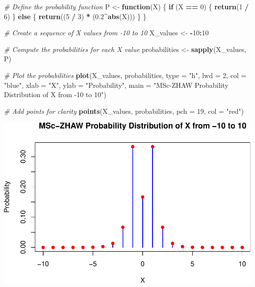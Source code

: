 \documentclass[
]{book}
\newenvironment{Shaded}{\begin{snugshade}}{\end{snugshade}}
\newcommand{\AttributeTok}[1]{\textcolor[rgb]{0.13,0.29,0.53}{#1}}
\newcommand{\CommentTok}[1]{\textcolor[rgb]{0.56,0.35,0.01}{\textit{#1}}}
\newcommand{\ControlFlowTok}[1]{\textcolor[rgb]{0.13,0.29,0.53}{\textbf{#1}}}
\newcommand{\DecValTok}[1]{\textcolor[rgb]{0.00,0.00,0.81}{#1}}
\newcommand{\FloatTok}[1]{\textcolor[rgb]{0.00,0.00,0.81}{#1}}
\newcommand{\FunctionTok}[1]{\textcolor[rgb]{0.13,0.29,0.53}{\textbf{#1}}}
\newcommand{\NormalTok}[1]{#1}
\newcommand{\OtherTok}[1]{\textcolor[rgb]{0.56,0.35,0.01}{#1}}
\newcommand{\SpecialCharTok}[1]{\textcolor[rgb]{0.81,0.36,0.00}{\textbf{#1}}}
\newcommand{\StringTok}[1]{\textcolor[rgb]{0.31,0.60,0.02}{#1}}
\newcommand{\pandocbounded}[1]{#1}
\begin{document}
\begin{Shaded}
\begin{Highlighting}[]
\CommentTok{\# Define the probability function}
\NormalTok{P }\OtherTok{\textless{}{-}} \ControlFlowTok{function}\NormalTok{(X) \{}
  \ControlFlowTok{if}\NormalTok{ (X }\SpecialCharTok{==} \DecValTok{0}\NormalTok{) \{}
    \FunctionTok{return}\NormalTok{(}\DecValTok{1} \SpecialCharTok{/} \DecValTok{6}\NormalTok{)}
\NormalTok{  \} }\ControlFlowTok{else}\NormalTok{ \{}
    \FunctionTok{return}\NormalTok{((}\DecValTok{5} \SpecialCharTok{/} \DecValTok{3}\NormalTok{) }\SpecialCharTok{*}\NormalTok{ (}\FloatTok{0.2}\SpecialCharTok{\^{}}\FunctionTok{abs}\NormalTok{(X)))}
\NormalTok{  \}}
\NormalTok{\}}

\CommentTok{\# Create a sequence of X values from {-}10 to 10}
\NormalTok{X\_values }\OtherTok{\textless{}{-}} \SpecialCharTok{{-}}\DecValTok{10}\SpecialCharTok{:}\DecValTok{10}

\CommentTok{\# Compute the probabilities for each X value}
\NormalTok{probabilities }\OtherTok{\textless{}{-}} \FunctionTok{sapply}\NormalTok{(X\_values, P)}

\CommentTok{\# Plot the probabilities}
\FunctionTok{plot}\NormalTok{(X\_values, probabilities, }\AttributeTok{type =} \StringTok{"h"}\NormalTok{, }\AttributeTok{lwd =} \DecValTok{2}\NormalTok{, }\AttributeTok{col =} \StringTok{"blue"}\NormalTok{,}
     \AttributeTok{xlab =} \StringTok{"X"}\NormalTok{, }\AttributeTok{ylab =} \StringTok{"Probability"}\NormalTok{,}
     \AttributeTok{main =} \StringTok{"MSc{-}ZHAW Probability Distribution of X from {-}10 to 10"}\NormalTok{)}

\CommentTok{\# Add points for clarity}
\FunctionTok{points}\NormalTok{(X\_values, probabilities, }\AttributeTok{pch =} \DecValTok{19}\NormalTok{, }\AttributeTok{col =} \StringTok{"red"}\NormalTok{)}
\end{Highlighting}
\end{Shaded}

\pandocbounded{\includegraphics[keepaspectratio]{_main_files/figure-latex/unnamed-chunk-14-1.pdf}}
\end{document}
